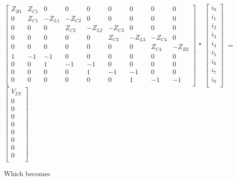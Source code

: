 \documentclass[11pt,a4paper]{article}
\begin{document}
$\begin{bmatrix*}
	Z_{R1} & Z_{C1} & 0 & 0 & 0 & 0 & 0 & 0 & 0 \\
	0 & Z_{C1} & -Z_{L1} & -Z_{C2} & 0 & 0 & 0 & 0 & 0\\
	0 & 0 &  0 & Z_{C2} & -Z_{L2} & -Z_{C3} & 0 & 0 & 0\\
	0 & 0 & 0 & 0 & 0 & Z_{C3} & -Z_{L3} & -Z_{C4} & 0\\
	0 & 0 & 0 & 0 & 0 & 0 & 0 & Z_{C4} & -Z_{R2}\\
	1 & -1 & -1 & 0 & 0 & 0 & 0 & 0 & 0\\
	0 & 0 & 1 & -1 & -1 & 0 & 0 & 0 & 0\\
	0 & 0 & 0 & 0 & 1 & -1 & -1 & 0 & 0\\
	0 & 0 & 0 & 0 & 0 & 0 & 1 & -1 & -1\\
\end{bmatrix*}$
$ * $
$\begin{bmatrix}
	i_{0}\\
	i_{1}\\
	i_{2}\\
	i_{3}\\
	i_{4}\\
	i_{5}\\
	i_{6}\\
	i_{7}\\
	i_{8}\\
\end{bmatrix}$
$ = $
$\begin{bmatrix}
	V_{IN}\\
	0\\
	0\\
	0\\
	0\\
	0\\
	0\\
	0\\
	0\\
\end{bmatrix}$ \bigskip

Which becomes \\
\end{document}
